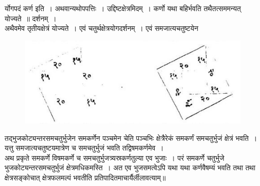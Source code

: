 \documentclass[11pt, openany]{book}
\begin{document}
\noindent र्योगपदं कर्ण इति~। अथवान्यथोपपत्तिः~। उद्दिष्टक्षेत्रमिदम्~।  कर्णो यथा बहिर्भवति तथैतत्सममन्यत् योज्यते~॥ दर्शनम्~। \\

\vspace{1mm}
अथैवमेव तृतीयक्षेत्रं योज्यते~। एवं चतुर्थक्षेत्रयोगदर्शनम्~। एवं समजात्यचतुष्टयेन
 
\begin{figure}[h!]
    \centering
    \includegraphics[scale=0.8]{Graphics/Capture12.JPG}
\end{figure}

\noindent तद्भुजकोट्यन्तरसमचतुर्भुजेन समकर्णेन पञ्चमेन चेति पञ्चभिः क्षेत्रैरेकं समकर्णं समचतुर्भुजं क्षेत्रं भवति~। यत्तु समजात्यचतुष्टयमात्रेण च समचतुर्भुजं भवति तद्विषमकर्णमेव~। \\

\vspace{-3mm}
 अथ प्रकृते समकर्णे विषमकर्णे च समचतुर्भुजत्र्यस्रकर्णतुल्या एव 
भुजाः~। परं समकर्णे चतुर्भुजे भुजकोट्यन्तरसमचतुर्भुजं क्षेत्रमधिकमस्ति~।
अत एव भुजसमत्वेऽपि यथा यथा कर्णवैषम्यं भवति तथा तथा क्षेत्रसङ्कोचात् 
क्षेत्रफलमल्पं भवतीति प्रतिपादितमाचार्यैर्लीलावत्याम्॥ \\
\end{document}
